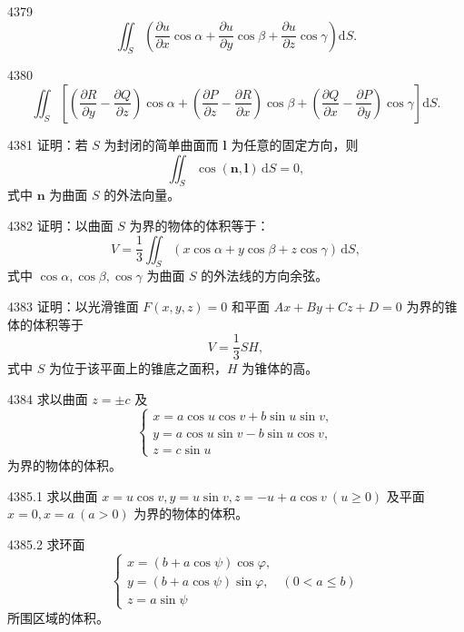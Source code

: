 \begin{prob}[S]{4379}
\[\iint_{S} \left(\frac{\partial u}{\partial x}\cos\alpha + \frac{\partial u}{\partial y}\cos\beta + \frac{\partial u}{\partial z}\cos\gamma\right)\mathrm{d}S.\]
\end{prob}

\begin{prob}[S]{4380}
\[\iint_{S} \left[\left(\frac{\partial R}{\partial y} - \frac{\partial Q}{\partial z}\right)\cos\alpha + \left(\frac{\partial P}{\partial z} - \frac{\partial R}{\partial x}\right)\cos\beta + \left(\frac{\partial Q}{\partial x} - \frac{\partial P}{\partial y}\right)\cos\gamma\right]\mathrm{d}S.\]
\end{prob}

\begin{prob}[M]{4381}
证明：若 $S$ 为封闭的简单曲面而 $\boldsymbol{l}$ 为任意的固定方向，则
\[\iint_{S} \cos(\boldsymbol{n}, \boldsymbol{l})\,\mathrm{d}S = 0,\]
式中 $\boldsymbol{n}$ 为曲面 $S$ 的外法向量。
\end{prob}

\begin{prob}[M]{4382}
证明：以曲面 $S$ 为界的物体的体积等于：
\[V = \frac{1}{3} \iint_{S} (x\cos\alpha + y\cos\beta + z\cos\gamma)\,\mathrm{d}S,\]
式中 $\cos\alpha, \cos\beta, \cos\gamma$ 为曲面 $S$ 的外法线的方向余弦。
\end{prob}

\begin{prob}[M]{4383}
证明：以光滑锥面 $F(x,y,z)=0$ 和平面 $Ax+By+Cz+D=0$ 为界的锥体的体积等于
\[V = \frac{1}{3}SH,\]
式中 $S$ 为位于该平面上的锥底之面积，$H$ 为锥体的高。
\end{prob}

\begin{prob}[M]{4384}
求以曲面 $z = \pm c$ 及
\[\begin{cases} x = a\cos u\cos v + b\sin u\sin v, \\ y = a\cos u\sin v - b\sin u\cos v, \\ z = c\sin u \end{cases}\]
为界的物体的体积。
\end{prob}

\begin{prob}[M]{4385.1}
求以曲面 $x = u\cos v, y = u\sin v, z = -u + a\cos v\ (u \geqslant 0)$ 及平面 $x = 0, x = a\ (a > 0)$ 为界的物体的体积。
\end{prob}

\begin{prob}[M]{4385.2}
求环面
\[\begin{cases} x = (b + a\cos\psi)\cos\varphi, \\ y = (b + a\cos\psi)\sin\varphi, \quad (0 < a \leqslant b) \\ z = a\sin\psi \end{cases}\]
所围区域的体积。
\end{prob}

